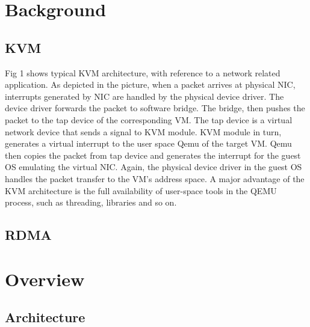 \section{Background} \label{sec:background}

\subsection{KVM} \label{sec:kvm}

Fig 1 shows typical KVM architecture, with reference to a network related
application. As depicted in the picture, when a packet arrives at physical NIC,
interrupts generated by NIC are handled by the physical device driver. The device
driver forwards the packet to software bridge. The bridge, then pushes the packet
to the tap device of the corresponding VM. The tap device is a virtual network
device that sends a signal to KVM module. KVM module in turn, generates a virtual
interrupt to the user space Qemu of the target VM. Qemu then copies the packet from
tap device and generates the interrupt for the guest OS emulating the virtual NIC.
Again, the physical device driver in the guest OS handles the packet transfer to
the VM’s address space. A major advantage of the KVM architecture is the full
availability of user-space tools in the QEMU process, such as threading, libraries
and so on.

\subsection{\paxos}\label{sec:paxos}

\subsection{RDMA} \label{sec:rdma}

\section{\xxx Overview} \label{sec:overview}

\subsection{Architecture} \label{sec:arch}
